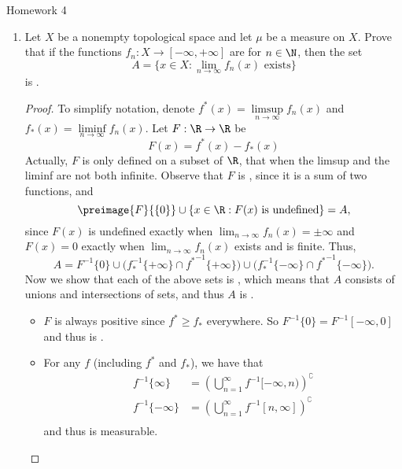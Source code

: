 \documentclass[12pt,letterpaper]{article}
\begin{document}
\pagestyle{fancy}
\begin{center}
{\Large Homework 4}%
\end{center}

\begin{enumerate}
\item Let $X$ be a nonempty topological space and let $\mu$ be a measure on $X$. Prove that if the functions $f_n:X\to [-\infty,+\infty]$ are \mumeasurable{} for $n\in \N$, then the set 
$$A=\{x\in X : \lim_{n\to\infty}f_n(x) \text{ exists}\}$$
is \mumeasurable{}. 
\begin{proof}
To simplify notation, denote $f^*(x)=\limsup\limits_{n\to\infty} f_n(x)$ and $f_*(x)=\liminf\limits_{n\to\infty} f_n(x)$. 
Let $F:\R\to\R$ be 
$$F(x)=f^*(x)-f_*(x)
$$
Actually, $F$ is only defined on a subset of $\R$, that when the limsup and the liminf are not both infinite. 
Observe that $F$ is \mumeasurable{}, since it is a sum of two \mumeasurable{} functions, and 
$$\preimage{F}{\{0\}}\cup\{x\in \R:F(x) \text{ is undefined}\}=A,$$
since $F(x)$ is undefined exactly when $\lim_{n\to\infty} f_n(x)=\pm\infty$ and $F(x)=0$ exactly when $\lim_{n\to\infty} f_n(x)$ exists and is finite. Thus, 
$$A={F}^{-1}{\{0\}}
\cup \big(f_*^{-1}{\{+\infty\}} \cap {{f^*}^{-1}}{\{+\infty\}}\big)
\cup \big({f_*^{-1}}{\{-\infty\}} \cap {{f^*}^{-1}}{\{-\infty\}}\big).
$$
Now we show that each of the above sets is \mumeasurable{}, which means that $A$ consists of unions and intersections of \mumeasurable{} sets, and thus $A$ is \mumeasurable{}. 
\begin{itemize}
	\item $F$ is always positive since $f^*\geq f_*$ everywhere. So $F^{-1}\{0\}=F^{-1}[-\infty, 0]$ and thus is \mumeasurable{}. 
	\item For any \mumeasurable{} $f$ (including $f^*$ and $f_*$), we have that 
	\begin{align*}
	{f}^{-1}{\{\infty\}}&=\left(\bigcup_{n=1}^\infty	f^{-1}[-\infty,n)\right)^\complement\\
	{f}^{-1}{\{-\infty\}}&=\left(\bigcup_{n=1}^\infty	f^{-1}[n,\infty]\right)^\complement\\
	\end{align*}		
	and thus is measurable.
\end{itemize}
\end{proof}




\end{enumerate}
\end{document}
